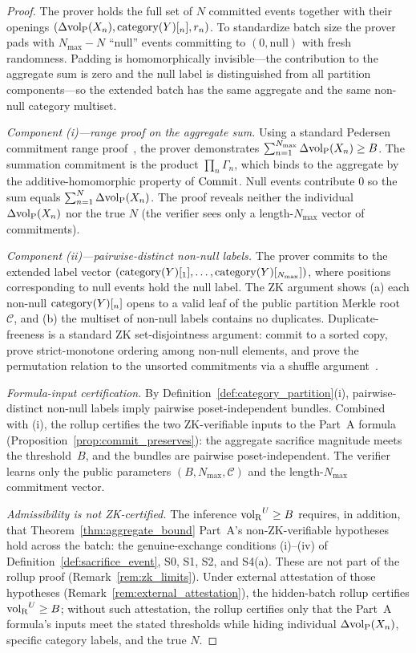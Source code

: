 \begin{proof}
The prover holds the full set of $N$ committed events together
with their openings $(\Delta{\operatorname{vol}_{\mathrm{P}}}(X_n), \mathrm{category}(Y)[_n], r_n)$.  To
standardize batch size the prover pads with $N_{\max} - N$
``null'' events committing to $(0, \mathrm{null})$ with fresh
randomness.  Padding is homomorphically invisible---the
contribution to the aggregate sum is zero and the null label is
distinguished from all partition components---so the extended
batch has the same aggregate and the same non-null category
multiset.

\emph{Component (i)---range proof on the aggregate sum.}
Using a standard Pedersen commitment range
proof~\citep[Definition~7]{lasser2026exo}, the prover
demonstrates
$\sum_{n=1}^{N_{\max}} \Delta{\operatorname{vol}_{\mathrm{P}}}(X_n) \geq B$.  The summation
commitment is the product $\prod_n \Gamma_n$, which binds to the
aggregate by the additive-homomorphic property of $\mathrm{Commit}$.
Null events contribute $0$ so the sum equals
$\sum_{n=1}^N \Delta{\operatorname{vol}_{\mathrm{P}}}(X_n)$.  The proof reveals neither the
individual $\Delta{\operatorname{vol}_{\mathrm{P}}}(X_n)$ nor the true $N$ (the verifier
sees only a length-$N_{\max}$ vector of commitments).

\emph{Component (ii)---pairwise-distinct non-null labels.}
The prover commits to the extended label vector
$(\mathrm{category}(Y)[_1], \ldots, \mathrm{category}(Y)[_{N_{\max}}])$, where positions
corresponding to null events hold the null label.  The ZK
argument shows (a) each non-null $\mathrm{category}(Y)[_n]$ opens to a valid
leaf of the public partition Merkle root $\mathcal{C}$, and (b)
the multiset of non-null labels contains no duplicates.
Duplicate-freeness is a standard ZK set-disjointness argument:
commit to a sorted copy, prove strict-monotone ordering
among non-null elements, and prove the permutation relation to
the unsorted commitments via a shuffle
argument~\citep[Definition~7]{lasser2026exo}.

\emph{Formula-input certification.}
By Definition~\ref{def:category_partition}(i), pairwise-distinct
non-null labels imply pairwise poset-independent bundles.
Combined with (i), the rollup certifies the two ZK-verifiable
inputs to the Part~A formula
(Proposition~\ref{prop:commit_preserves}): the aggregate
sacrifice magnitude meets the threshold~$B$, and the bundles are
pairwise poset-independent.  The verifier learns only the public
parameters $(B, N_{\max}, \mathcal{C})$ and the
length-$N_{\max}$ commitment vector.

\emph{Admissibility is not ZK-certified.}  The inference
${\operatorname{vol}_{\mathrm{R}}}^U \geq B$ requires, in addition, that
Theorem~\ref{thm:aggregate_bound} Part~A's non-ZK-verifiable
hypotheses hold across the batch: the genuine-exchange
conditions (i)--(iv) of Definition~\ref{def:sacrifice_event},
S0, S1, S2, and S4(a).  These are not part of the rollup proof
(Remark~\ref{rem:zk_limits}).  Under external attestation of
those hypotheses (Remark~\ref{rem:external_attestation}), the
hidden-batch rollup certifies ${\operatorname{vol}_{\mathrm{R}}}^U \geq B$; without such
attestation, the rollup certifies only that the Part~A formula's
inputs meet the stated thresholds while hiding individual
$\Delta{\operatorname{vol}_{\mathrm{P}}}(X_n)$, specific category labels, and the true $N$.
\end{proof}

